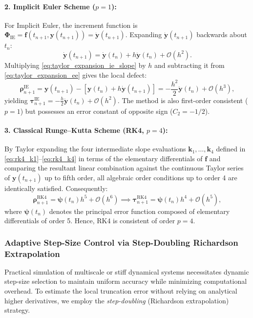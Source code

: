 \documentclass[11pt,a4paper]{article}
\theoremstyle{definition}
\theoremstyle{remark}
\begin{document}
\paragraph{2. Implicit Euler Scheme ($p=1$):}
For Implicit Euler, the increment function is $\mathbf{\Phi}_{\text{IE}} = \mathbf{f}(t_{n+1}, \mathbf{y}(t_{n+1})) = \dot{\mathbf{y}}(t_{n+1})$. Expanding $\dot{\mathbf{y}}(t_{n+1})$ backwards about $t_n$:
\begin{equation}
\label{eq:taylor_expansion_ie_slope}
\dot{\mathbf{y}}(t_{n+1}) = \dot{\mathbf{y}}(t_n) + h \ddot{\mathbf{y}}(t_n) + \mathcal{O}(h^2).
\end{equation}
Multiplying \eqref{eq:taylor_expansion_ie_slope} by $h$ and subtracting it from \eqref{eq:taylor_expansion_ee} gives the local defect:
\begin{equation}
\label{eq:ie_defect_expansion}
\boldsymbol{\rho}_{n+1}^{\text{IE}} = \mathbf{y}(t_{n+1}) - \left[ \mathbf{y}(t_n) + h \dot{\mathbf{y}}(t_{n+1}) \right] = -\frac{h^2}{2} \ddot{\mathbf{y}}(t_n) + \mathcal{O}(h^3),
\end{equation}
yielding $\boldsymbol{\tau}_{n+1}^{\text{IE}} = -\frac{h}{2} \ddot{\mathbf{y}}(t_n) + \mathcal{O}(h^2)$. The method is also first-order consistent ($p=1$) but possesses an error constant of opposite sign ($C_2 = -1/2$).

\paragraph{3. Classical Runge--Kutta Scheme (RK4, $p=4$):}
By Taylor expanding the four intermediate slope evaluations $\mathbf{k}_1, \dots, \mathbf{k}_4$ defined in \eqref{eq:rk4_k1}--\eqref{eq:rk4_k4} in terms of the elementary differentials of $\mathbf{f}$ and comparing the resultant linear combination against the continuous Taylor series of $\mathbf{y}(t_{n+1})$ up to fifth order, all algebraic order conditions up to order 4 are identically satisfied. Consequently:
\begin{equation}
\label{eq:rk4_defect}
\boldsymbol{\rho}_{n+1}^{\text{RK4}} = \boldsymbol{\psi}(t_n) h^5 + \mathcal{O}(h^6) \implies \boldsymbol{\tau}_{n+1}^{\text{RK4}} = \boldsymbol{\psi}(t_n) h^4 + \mathcal{O}(h^5),
\end{equation}
where $\boldsymbol{\psi}(t_n)$ denotes the principal error function composed of elementary differentials of order 5. Hence, RK4 is consistent of order $p=4$.

\subsubsection{Adaptive Step-Size Control via Step-Doubling Richardson Extrapolation}
Practical simulation of multiscale or stiff dynamical systems necessitates dynamic step-size selection to maintain uniform accuracy while minimizing computational overhead. To estimate the local truncation error without relying on analytical higher derivatives, we employ the \emph{step-doubling} (Richardson extrapolation) strategy.
\end{document}
